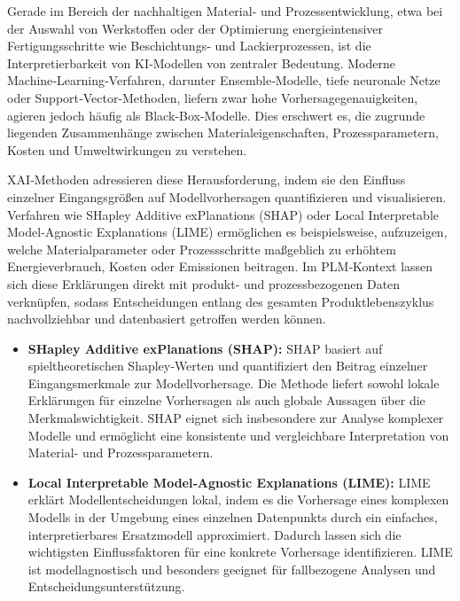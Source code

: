 Gerade im Bereich der nachhaltigen Material‑ und Prozessentwicklung, etwa bei der Auswahl von Werkstoffen oder der Optimierung energieintensiver Fertigungsschritte wie Beschichtungs‑ und Lackierprozessen, ist die Interpretierbarkeit von KI‑Modellen von zentraler Bedeutung. Moderne Machine‑Learning‑Verfahren, darunter Ensemble‑Modelle, tiefe neuronale Netze oder Support‑Vector‑Methoden, liefern zwar hohe Vorhersagegenauigkeiten, agieren jedoch häufig als Black‑Box‑Modelle. Dies erschwert es, die zugrunde liegenden Zusammenhänge zwischen Materialeigenschaften, Prozessparametern, Kosten und Umweltwirkungen zu verstehen. \cite{liu2025explainable}

XAI‑Methoden adressieren diese Herausforderung, indem sie den Einfluss einzelner Eingangsgrößen auf Modellvorhersagen quantifizieren und visualisieren. Verfahren wie SHapley Additive exPlanations (SHAP)  oder Local Interpretable Model‑Agnostic Explanations (LIME) ermöglichen es beispielsweise, aufzuzeigen, welche Materialparameter oder Prozessschritte maßgeblich zu erhöhtem Energieverbrauch, Kosten oder Emissionen beitragen. Im PLM‑Kontext lassen sich diese Erklärungen direkt mit produkt‑ und prozessbezogenen Daten verknüpfen, sodass Entscheidungen entlang des gesamten Produktlebenszyklus nachvollziehbar und datenbasiert getroffen werden können. \cite{arrieta2020explainable}

\begin{itemize}
	\item \textbf{SHapley Additive exPlanations (SHAP):}  
	SHAP basiert auf spieltheoretischen Shapley‑Werten und quantifiziert den Beitrag einzelner Eingangsmerkmale zur Modellvorhersage. Die Methode liefert sowohl lokale Erklärungen für einzelne Vorhersagen als auch globale Aussagen über die Merkmalswichtigkeit. SHAP eignet sich insbesondere zur Analyse komplexer Modelle und ermöglicht eine konsistente und vergleichbare Interpretation von Material‑ und Prozessparametern.\cite{nohara2022explanation}
	
	\item \textbf{Local Interpretable Model‑Agnostic Explanations (LIME):}  
	LIME erklärt Modellentscheidungen lokal, indem es die Vorhersage eines komplexen Modells in der Umgebung eines einzelnen Datenpunkts durch ein einfaches, interpretierbares Ersatzmodell approximiert. Dadurch lassen sich die wichtigsten Einflussfaktoren für eine konkrete Vorhersage identifizieren. LIME ist modellagnostisch und besonders geeignet für fallbezogene Analysen und Entscheidungsunterstützung. \cite{zafar2021deterministic}
\end{itemize}

